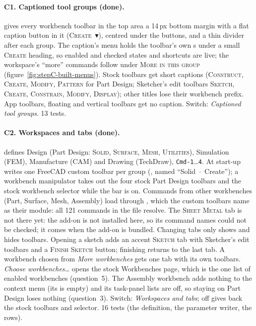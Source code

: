 \paragraph{C1. Captioned tool groups (done).}  gives every workbench toolbar in the
top area a 14\,px bottom margin with a flat caption button in it (\textsc{Create}~$\blacktriangledown$), centred
under the buttons, and a thin divider after each group. The caption's menu holds the toolbar's own
s under a small \textsc{Create} heading, so enabled and checked states and shortcuts are live; the
workspace's ``more'' commands follow under \textsc{More in this group} (figure~\ref{fig:stepC-built-menus}). Stock
toolbars get short captions (\textsc{Construct}, \textsc{Create}, \textsc{Modify}, \textsc{Pattern} for Part
Design; Sketcher's edit toolbars \textsc{Sketch}, \textsc{Create}, \textsc{Constrain}, \textsc{Modify},
\textsc{Display}); other titles lose their workbench prefix. App toolbars, floating and vertical toolbars get no
caption. Switch: \emph{Captioned tool groups}. 13 tests.

\paragraph{C2. Workspaces and tabs (done).}  defines Design (Part Design: \textsc{Solid},
\textsc{Surface}, \textsc{Mesh}, \textsc{Utilities}), Simulation (FEM), Manufacture (CAM) and Drawing (TechDraw),
\texttt{Cmd-1}\ldots\texttt{4}. At start-up  writes one FreeCAD custom toolbar per
group (, named ``Solid~$\cdot$~Create''); a workbench
manipulator takes out the four stock Part Design toolbars and the stock workbench selector while the bar is on.
Commands from other workbenches (Part, Surface, Mesh, Assembly) load through , which
the custom toolbars name as their module: all 121 commands in the file resolve. The \textsc{Sheet Metal} tab is not
there yet: the add-on is not installed here, so its command names could not be checked; it comes when the
add-on is bundled. Changing tabs only shows and hides toolbars. Opening a sketch adds an accent \textsc{Sketch} tab with Sketcher's edit toolbars and a
\textsc{Finish Sketch} button; finishing returns to the last tab. A workbench chosen from \emph{More workbenches}
gets one tab with its own toolbars. \emph{Choose workbenches\ldots} opens the stock Workbenches page, which is the
one list of enabled workbenches (question~5). The Assembly workbench adds nothing to the context menu (its
 is empty) and its task-panel lists are off, so staying on Part Design loses nothing
(question~3). Switch: \emph{Workspaces and tabs}; off gives back the stock toolbars and selector. 16 tests (the
definition, the parameter writer, the rows).

